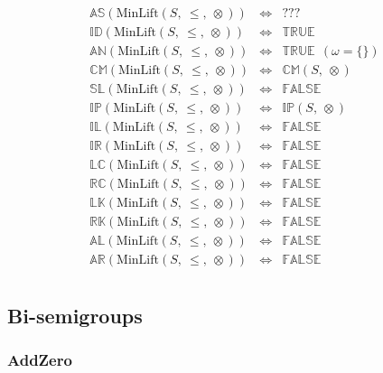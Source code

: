 \documentclass[10pt]{article}
\newcommand{\propname}[1]{{\mathbb{#1}}}
\begin{document}
\[
\begin{array}{rcl} 
\propname{AS}(\mathrm{MinLift}(S,\ \leq,\ \otimes)) 
  & \Leftrightarrow 
  & ???
  \\ 
\propname{ID}(\mathrm{MinLift}(S,\ \leq,\ \otimes)) 
  & \Leftrightarrow 
  & \propname{TRUE}
  \\ 
\propname{AN}(\mathrm{MinLift}(S,\ \leq,\ \otimes)) 
  & \Leftrightarrow 
  & \propname{TRUE} \ \ (\omega = \{\})
  \\
\propname{CM}(\mathrm{MinLift}(S,\ \leq,\ \otimes)) 
  & \Leftrightarrow 
  & \propname{CM}(S,\ \otimes)
  \\ 
\propname{SL}(\mathrm{MinLift}(S,\ \leq,\ \otimes)) 
  & \Leftrightarrow 
  & \propname{FALSE}
  \\ 
\propname{IP}(\mathrm{MinLift}(S,\ \leq,\ \otimes)) 
  & \Leftrightarrow
  & \propname{IP}(S,\ \otimes)
  \\ 
\propname{IL}(\mathrm{MinLift}(S,\ \leq,\ \otimes)) 
  & \Leftrightarrow 
  & \propname{FALSE} 
  \\ 
\propname{IR}(\mathrm{MinLift}(S,\ \leq,\ \otimes)) 
  & \Leftrightarrow 
  & \propname{FALSE} 
  \\ 
\propname{LC}(\mathrm{MinLift}(S,\ \leq,\ \otimes)) 
  & \Leftrightarrow 
  & \propname{FALSE} 
  \\ 
\propname{RC}(\mathrm{MinLift}(S,\ \leq,\ \otimes)) 
  & \Leftrightarrow 
  & \propname{FALSE} 
  \\ 
\propname{LK}(\mathrm{MinLift}(S,\ \leq,\ \otimes)) 
  & \Leftrightarrow 
  & \propname{FALSE} 
  \\ 
\propname{RK}(\mathrm{MinLift}(S,\ \leq,\ \otimes)) 
  & \Leftrightarrow 
  & \propname{FALSE} 
  \\ 
\propname{AL}(\mathrm{MinLift}(S,\ \leq,\ \otimes))  
  & \Leftrightarrow 
  &  \propname{FALSE} 
  \\ 
\propname{AR}(\mathrm{MinLift}(S,\ \leq,\ \otimes))  
  & \Leftrightarrow 
  & \propname{FALSE}  
  \\ 
\end{array} 
\] 


\subsection{Bi-semigroups}

\subsubsection{AddZero} 
\end{document}
